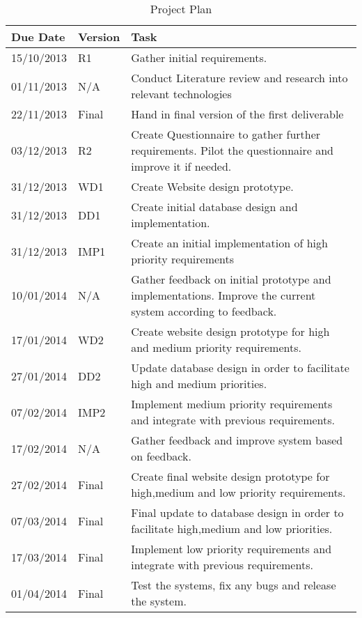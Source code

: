 \documentclass[a4paper,oneside,11pt]{report}
\begin{document}
\begin{center}
	\begin{table}[!ht]
    \begin{tabular}[ht]{| l | l | p{11cm} |}
    \hline
    Due Date & Version & Task \\ 
    \hline
    15/10/2013 & R1 & Gather initial requirements.\\ 
    \hline
    01/11/2013 & N/A & Conduct Literature review and research into relevant 												  technologies \\ 
    \hline
    22/11/2013 & Final & Hand in final version of the first deliverable \\ 
    \hline
    03/12/2013 & R2 & Create Questionnaire to gather further requirements. Pilot the 										questionnaire and improve it if needed.\\ 
    \hline
    31/12/2013 & WD1 & Create Website design prototype.\\
    \hline
    31/12/2013 & DD1 & Create initial database design and implementation.\\
    \hline
    31/12/2013 & IMP1 & Create an initial implementation of high priority requirements\\
    \hline
    10/01/2014 & N/A & Gather feedback on initial prototype and implementations. Improve 	                  				   the current system according to feedback.\\
    \hline
     17/01/2014 & WD2 & Create website design prototype for high and medium priority 										  requirements.\\
    \hline
    27/01/2014 & DD2 & Update database design in order to facilitate high and medium 		 								 priorities.\\
    \hline
    07/02/2014 & IMP2 & Implement medium priority requirements and integrate with previous requirements.		\\
    \hline
    17/02/2014 & N/A & Gather feedback and improve system based on feedback.\\
    \hline
    27/02/2014 & Final & Create final website design prototype for high,medium and low priority 			 			 requirements.\\
    \hline
    07/03/2014 & Final & Final update to database design in order to facilitate high,medium and low		 		             priorities.\\
    \hline
    17/03/2014 & Final & Implement low priority requirements and integrate with previous requirements.\\
    \hline
    01/04/2014 & Final & Test the systems, fix any bugs and release the system.\\
    \hline
    \end{tabular}
    \caption{Project Plan}
\label{tab:test}
    \end{table}
    \end{center}

\printbibliography
\end{document}

